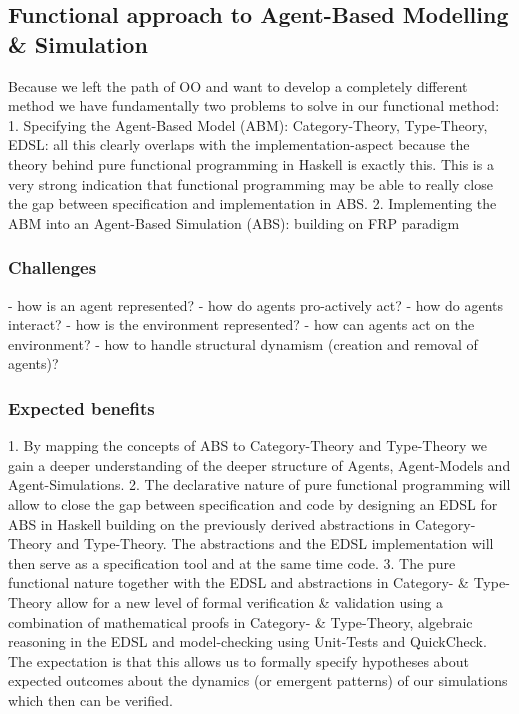 \subsection{Functional approach to Agent-Based Modelling \& Simulation}
Because we left the path of OO and want to develop a completely different method we have fundamentally two problems to solve in our functional method:
1. Specifying the Agent-Based Model (ABM): Category-Theory, Type-Theory, EDSL: all this clearly overlaps with the  implementation-aspect because the theory behind pure functional programming in Haskell is exactly this. This is a very strong indication that functional programming may be able to really close the gap between specification and implementation in ABS.
2. Implementing the ABM into an Agent-Based Simulation (ABS): building on FRP paradigm

\subsubsection{Challenges}
- how is an agent represented?
- how do agents pro-actively act?
- how do agents interact?
- how is the environment represented?
- how can agents act on the environment?
- how to handle structural dynamism (creation and removal of agents)?

\subsubsection{Expected benefits}
1. By mapping the concepts of ABS to Category-Theory and Type-Theory we gain a deeper understanding of the deeper structure of Agents, Agent-Models and Agent-Simulations.
2. The declarative nature of pure functional programming will allow to close the gap between specification and code by designing an EDSL for ABS in Haskell building on the previously derived abstractions in Category-Theory and Type-Theory. The abstractions and the EDSL implementation will then serve as a specification tool and at the same time code.
3. The pure functional nature together with the EDSL and abstractions in Category- \& Type-Theory allow for a new level of formal verification \& validation using a combination of mathematical proofs in Category- \& Type-Theory, algebraic reasoning in the EDSL and model-checking using Unit-Tests and QuickCheck. The expectation is that this allows us to formally specify hypotheses about expected outcomes about the dynamics (or emergent patterns) of our simulations which then can be verified.

